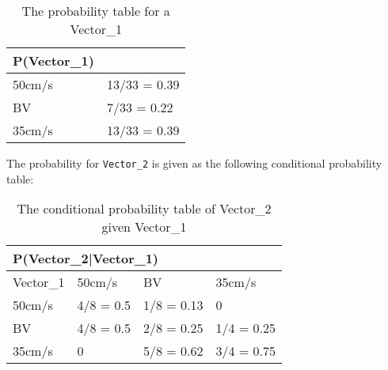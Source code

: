 \begin{center}
\begin{table}[H]
\begin{tabular}{|l|l|}
\hline
P(Vector\_1) &\\ \hline
50cm/s & 13/33 = 0.39   \\ \hline 
BV & 7/33 = 0.22  \\ \hline
35cm/s & 13/33 = 0.39  \\ \hline
\end{tabular}
\caption{The probability table for a Vector\_1}
\label{Vector0Table}
\end{table}
\end{center}

The probability for \texttt{Vector\_2} is given as the following conditional
probability table: 
\begin{table}[]
\centering
\begin{tabular}{|l|l|l|l|}
\hline
\multicolumn{4}{|l|}{P(Vector\_2|Vector\_1)} \\ \hline
 Vector\_1 & 50cm/s    & BV    & 35cm/s    \\ \hline
 50cm/s    & 4/8 = 0.5    & 1/8 = 0.13    & 0    \\ \hline
 BV   & 4/8 = 0.5    & 2/8 = 0.25    & 1/4 = 0.25  \\ \hline
 35cm/s    & 0            & 5/8 = 0.62    & 3/4 = 0.75  \\ \hline
\end{tabular}
\caption{The conditional probability table of Vector\_2 given Vector\_1}
\label{vector2tab} 
\end{table}

